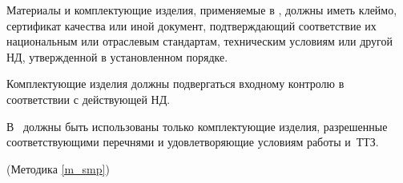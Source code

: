 Материалы и комплектующие изделия, применяемые в \dut, должны иметь клеймо, сертификат качества или иной документ, подтверждающий соответствие их национальным или отраслевым стандартам, техническим условиям или другой НД, утвержденной в установленном порядке.


Комплектующие изделия должны подвергаться входному контролю в соответствии с действующей НД.

В \dut \ должны быть использованы только комплектующие изделия, разрешенные соответствующими перечнями и удовлетворяющие условиям работы и~ТТЗ.


\begin{flushright}
	(Методика \ref{m_smp})
\end{flushright}

